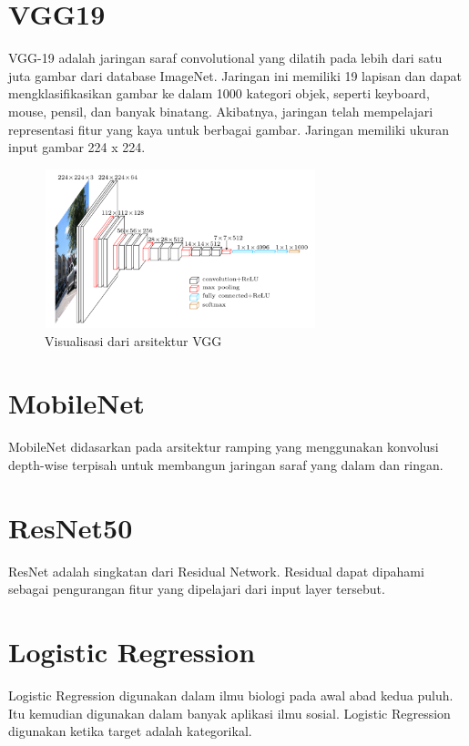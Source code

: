 \section{VGG19}
\par VGG-19 adalah jaringan saraf convolutional yang dilatih pada lebih dari satu juta gambar dari database ImageNet. Jaringan ini memiliki 19 lapisan dan dapat mengklasifikasikan gambar ke dalam 1000 kategori objek, seperti keyboard, mouse, pensil, dan banyak binatang. Akibatnya, jaringan telah mempelajari representasi fitur yang kaya untuk berbagai gambar. Jaringan memiliki ukuran input gambar 224 x 224\cite{vgg19_def}.
\begin{figure}[!ht]
	\centering\includegraphics[width=0.7\textwidth]{bab2/figures/figure-vgg.png}
	\caption{Visualisasi dari arsitektur VGG\cite{figure_vgg}}
	\label{fig:abstraksi1}
\end{figure}

\section{MobileNet}
\par MobileNet didasarkan pada arsitektur ramping yang menggunakan konvolusi depth-wise terpisah untuk membangun jaringan saraf yang dalam dan ringan\cite{mobilenet_def}. 

\section{ResNet50}
\par ResNet adalah singkatan dari Residual Network. Residual dapat dipahami sebagai pengurangan fitur yang dipelajari dari input layer tersebut\cite{resnet_def}.

\section{Logistic Regression}
\par Logistic Regression digunakan dalam ilmu biologi pada awal abad kedua puluh. Itu kemudian digunakan dalam banyak aplikasi ilmu sosial. Logistic Regression digunakan ketika target adalah kategorikal\cite{logistic_def}.

